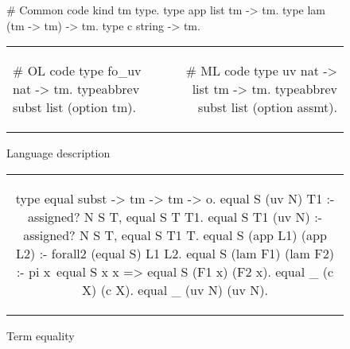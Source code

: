 \begin{figure*}
  \begin{minipage}{.40\textwidth}

    \begin{elpicode}
      # Common code
      kind tm type.
      type app list tm -> tm.
      type lam (tm -> tm) -> tm.
      type c string -> tm.
    \end{elpicode}
    
  \end{minipage}

  \vspace{3pt}

  \begin{tabular}{lr}
    \begin{minipage}{.40\textwidth}

      \begin{elpicode}
        # OL code
        type fo_uv  nat -> tm.
        typeabbrev subst list (option tm).
      \end{elpicode}
    \end{minipage}
    &
    \begin{minipage}{.40\textwidth}
      
      \begin{elpicode}
        # ML code
        type uv  nat -> list tm -> tm.
        typeabbrev subst list (option assmt).
      \end{elpicode}
    \end{minipage}
  \end{tabular}
  
  \caption{Language description}
  \label{code:lang-descr}
\end{figure*}



\begin{figure*}
  \begin{tabular}{c}
    \begin{minipage}{.80\textwidth}
      \begin{elpicode}
        type equal subst -> tm -> tm -> o.
        equal S (uv N) T1 :- assigned? N S T, equal S T T1.
        equal S T1 (uv N) :- assigned? N S T, equal S T1 T.
        equal S (app L1) (app L2) :- forall2 (equal S) L1 L2.
        equal S (lam F1) (lam F2) :- pi x\ equal S x x => equal S (F1 x) (F2 x).
        equal _ (c X) (c X).
        equal _ (uv N) (uv N).
      \end{elpicode}
    \end{minipage}
  \end{tabular}
  \caption{Term equality}
  \label{code:term-equal}
\end{figure*}

